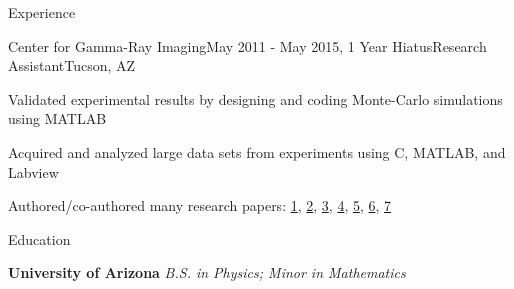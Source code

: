 \documentclass{resume} %
\begin{document}
\begin{rSection}{Experience}
	\begin{rSubsection}{Center for Gamma-Ray Imaging}{May 2011 - May 2015, 1 Year Hiatus}{Research Assistant}{Tucson, AZ}
	\item Validated experimental results by designing and coding Monte-Carlo simulations using MATLAB
	\item Acquired and analyzed large data sets from experiments using C, MATLAB, and Labview
	\item Authored/co-authored many research papers: 
		\href{https://www.spiedigitallibrary.org/conference-proceedings-of-spie/9215/92150F/Imaging-properties-of-pixellated-scintillators-with-deep-pixels/10.1117/12.2066172.short}{1},
		\href{https://www.sciencedirect.com/science/article/abs/pii/S0168900215008384}{2},
		\href{https://www.spiedigitallibrary.org/conference-proceedings-of-spie/9211/921105/Testing-of-a-gamma-ray-imaging-system-at-the-High/10.1117/12.2066254.short}{3},
		\href{https://www.spiedigitallibrary.org/conference-proceedings-of-spie/8854/88540J/Preliminary-investigation-fo-the-non-linear-response-of-image-intensifiers/10.1117/12.2030175.short}{4},
		\href{https://ieeexplore.ieee.org/abstract/document/7581943}{5},
		\href{https://www.spiedigitallibrary.org/conference-proceedings-of-spie/9595/959504/Negative-temporal-cross-covariance-in-SrI2Eu/10.1117/12.2214406.short}{6},
		\href{https://www.spiedigitallibrary.org/conference-proceedings-of-spie/8854/88540F/Testing-of-a-gamma-ray-imaging-system-at-Omega/10.1117/12.2024400.short}{7}

	\end{rSubsection}

\end{rSection}


\begin{rSection}{Education}
	
	{\bf University of Arizona} {\em B.S. in Physics; Minor in Mathematics} \\ 
	\nolinebreak	
	
\end{rSection}

\end{document}
